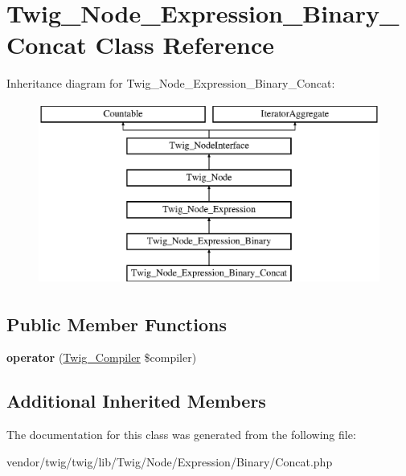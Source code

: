 \hypertarget{classTwig__Node__Expression__Binary__Concat}{}\section{Twig\+\_\+\+Node\+\_\+\+Expression\+\_\+\+Binary\+\_\+\+Concat Class Reference}
\label{classTwig__Node__Expression__Binary__Concat}
Inheritance diagram for Twig\+\_\+\+Node\+\_\+\+Expression\+\_\+\+Binary\+\_\+\+Concat\+:\begin{figure}[H]
\begin{center}
\leavevmode
\includegraphics[height=6.000000cm]{classTwig__Node__Expression__Binary__Concat}
\end{center}
\end{figure}
\subsection*{Public Member Functions}
\begin{DoxyCompactItemize}
\item 
{\bfseries operator} (\hyperlink{classTwig__Compiler}{Twig\+\_\+\+Compiler} \$compiler)\hypertarget{classTwig__Node__Expression__Binary__Concat_ae331649a99ef757e4a3c800d7b4a44ed}{}\label{classTwig__Node__Expression__Binary__Concat_ae331649a99ef757e4a3c800d7b4a44ed}

\end{DoxyCompactItemize}
\subsection*{Additional Inherited Members}


The documentation for this class was generated from the following file\+:\begin{DoxyCompactItemize}
\item 
vendor/twig/twig/lib/\+Twig/\+Node/\+Expression/\+Binary/Concat.\+php\end{DoxyCompactItemize}
